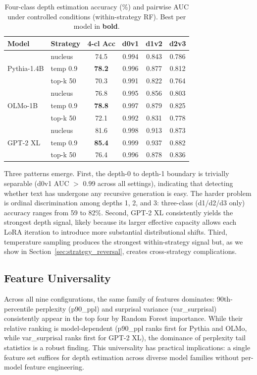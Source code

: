 \documentclass[11pt,a4paper]{article}
\begin{document}
\begin{table}[t]
\centering
\caption{Four-class depth estimation accuracy (\%) and pairwise AUC under controlled conditions (within-strategy RF). Best per model in \textbf{bold}.}
\label{tab:main_results}
\small
\begin{tabular}{llcccc}
\toprule
Model & Strategy & 4-cl Acc & d0v1 & d1v2 & d2v3 \\
\midrule
\multirow{3}{*}{Pythia-1.4B}
& nucleus & 74.5 & 0.994 & 0.843 & 0.786 \\
& temp 0.9 & \textbf{78.2} & 0.996 & 0.877 & 0.812 \\
& top-k 50 & 70.3 & 0.991 & 0.822 & 0.764 \\
\midrule
\multirow{3}{*}{OLMo-1B}
& nucleus & 76.8 & 0.995 & 0.856 & 0.803 \\
& temp 0.9 & \textbf{78.8} & 0.997 & 0.879 & 0.825 \\
& top-k 50 & 72.1 & 0.992 & 0.831 & 0.778 \\
\midrule
\multirow{3}{*}{GPT-2 XL}
& nucleus & 81.6 & 0.998 & 0.913 & 0.873 \\
& temp 0.9 & \textbf{85.4} & 0.999 & 0.937 & 0.882 \\
& top-k 50 & 76.4 & 0.996 & 0.878 & 0.836 \\
\bottomrule
\end{tabular}
\end{table}

Three patterns emerge.
First, the depth-0 to depth-1 boundary is trivially separable (d0v1 AUC $>$ 0.99 across all settings), indicating that detecting whether text has undergone any recursive generation is easy.
The harder problem is ordinal discrimination among depths 1, 2, and 3: three-class (d1/d2/d3 only) accuracy ranges from 59 to 82\%.
Second, GPT-2 XL consistently yields the strongest depth signal, likely because its larger effective capacity allows each LoRA iteration to introduce more substantial distributional shifts.
Third, temperature sampling produces the strongest within-strategy signal but, as we show in Section~\ref{sec:strategy_reversal}, creates cross-strategy complications.

\subsection{Feature Universality}
\label{sec:feature_universality}

Across all nine configurations, the same family of features dominates: 90th-percentile perplexity (p90\_ppl) and surprisal variance (var\_surprisal) consistently appear in the top four by Random Forest importance.
While their relative ranking is model-dependent (p90\_ppl ranks first for Pythia and OLMo, while var\_surprisal ranks first for GPT-2 XL), the dominance of perplexity tail statistics is a robust finding.
This universality has practical implications: a single feature set suffices for depth estimation across diverse model families without per-model feature engineering.
\end{document}
